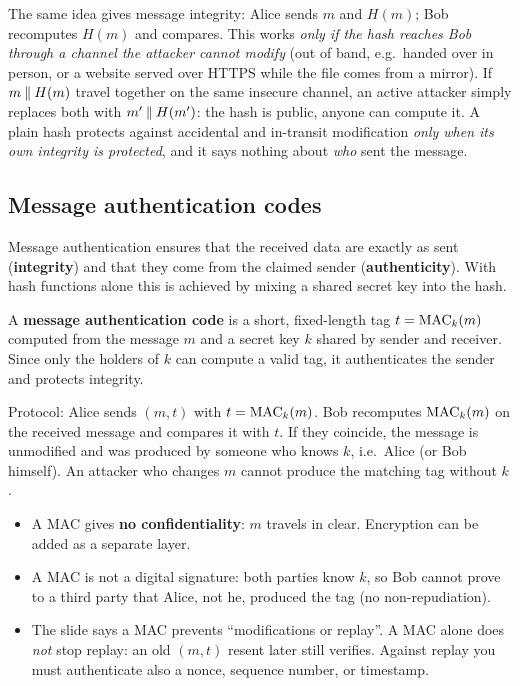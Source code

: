 The same idea gives message integrity: Alice sends $m$ and $H(m)$; Bob recomputes $H(m)$ and compares. This works \emph{only if the hash reaches Bob through a channel the attacker cannot modify} (out of band, e.g.\ handed over in person, or a website served over HTTPS while the file comes from a mirror). If $m \mathbin{\|} H(m)$ travel together on the same insecure channel, an active attacker simply replaces both with $m' \mathbin{\|} H(m')$: the hash is public, anyone can compute it. A plain hash protects against accidental and in-transit modification \emph{only when its own integrity is protected}, and it says nothing about \emph{who} sent the message.

\subsection{Message authentication codes}

Message authentication ensures that the received data are exactly as sent (\textbf{integrity}) and that they come from the claimed sender (\textbf{authenticity}). With hash functions alone this is achieved by mixing a shared secret key into the hash.

\begin{definition}[MAC]
A \textbf{message authentication code} is a short, fixed-length tag $t = \operatorname{MAC}_k(m)$ computed from the message $m$ and a secret key $k$ shared by sender and receiver. Since only the holders of $k$ can compute a valid tag, it authenticates the sender and protects integrity.
\end{definition}

Protocol: Alice sends $(m, t)$ with $t = \operatorname{MAC}_k(m)$. Bob recomputes $\operatorname{MAC}_k(m)$ on the received message and compares it with $t$. If they coincide, the message is unmodified and was produced by someone who knows $k$, i.e.\ Alice (or Bob himself). An attacker who changes $m$ cannot produce the matching tag without $k$.

\begin{remark}
\leavevmode
\begin{itemize}
    \item A MAC gives \textbf{no confidentiality}: $m$ travels in clear. Encryption can be added as a separate layer.
    \item A MAC is not a digital signature: both parties know $k$, so Bob cannot prove to a third party that Alice, not he, produced the tag (no non-repudiation).
    \item The slide says a MAC prevents \enquote{modifications or replay}. A MAC alone does \emph{not} stop replay: an old $(m, t)$ resent later still verifies. Against replay you must authenticate also a nonce, sequence number, or timestamp.
\end{itemize}
\end{remark}

